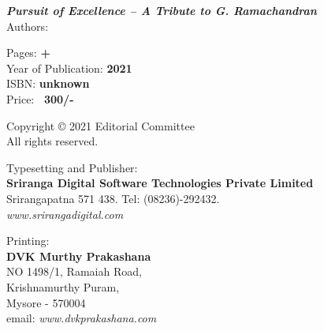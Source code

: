 \thispagestyle{empty}
\noindent
{\sl\bfseries Pursuit of Excellence – A Tribute to  G. Ramachandran}\\
Authors: 
\vfill

\noindent
Pages: {\bf \pageref{prelims} + \pageref{bookend}}\\
Year of Publication: {\bf 2021}\\
ISBN: {\bf unknown}\\
Price: {\bf \rupee\ 300/-}
\vfill

\noindent
Copyright © 2021 Editorial Committee\\
All rights reserved.
\vfill

\noindent
Typesetting and Publisher:\\
{\bf Sriranga Digital Software Technologies Private Limited}\\ 
Srirangapatna 571 438. Tel: (08236)-292432.\\
{\sl www.srirangadigital.com}\\
\vfill

\noindent
Printing:\\
{\bf DVK Murthy Prakashana}\\
NO 1498/1, Ramaiah Road,\\ 
Krishnamurthy Puram,\\ 
Mysore - 570004\\
email: {\sl www.dvkprakashana.com}
